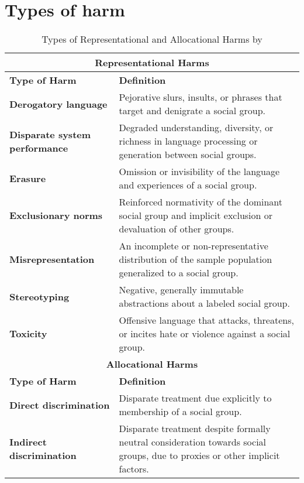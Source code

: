

\chapter{Types of harm}
\label{abc}
\begin{table}[h!]
    \centering
    \renewcommand{\arraystretch}{1.3}
    \begin{tabular}{|p{4cm}|p{10cm}|}
        \hline
        \multicolumn{2}{|c|}{\textbf{Representational Harms}} \\
        \hline
        \textbf{Type of Harm} & \textbf{Definition} \\
        \hline
        \textbf{Derogatory language} & Pejorative slurs, insults, or phrases that target and denigrate a social group.\\
        \hline
        \textbf{Disparate system performance} & Degraded understanding, diversity, or richness in language processing or generation between social groups.
         \\
        \hline
        \textbf{Erasure} & Omission or invisibility of the language and experiences of a social group.
        \\
        \hline
        \textbf{Exclusionary norms} & Reinforced normativity of the dominant social group and implicit exclusion or devaluation of other groups.  \\
        \hline
        \textbf{Misrepresentation} & An incomplete or non-representative distribution of the sample population generalized to a social group. \\
        \hline
        \textbf{Stereotyping} & Negative, generally immutable abstractions about a labeled social group. \\
        \hline
        \textbf{Toxicity} & Offensive language that attacks, threatens, or incites hate or violence against a social group. \\
        \hline
        \multicolumn{2}{|c|}{\textbf{Allocational Harms}} \\
        \hline
        \textbf{Type of Harm} & \textbf{Definition} \\
        \hline
        \textbf{Direct discrimination} & Disparate treatment due explicitly to membership of a social group. \\
        \hline
        \textbf{Indirect discrimination} & Disparate treatment despite formally neutral consideration towards social groups, due to proxies or other implicit factors. \\
        \hline
    \end{tabular}
    \caption{Types of Representational and Allocational Harms by \citet[p.1103]{gallegos_bias_2024}}
    \label{tab:harms}
\end{table}
